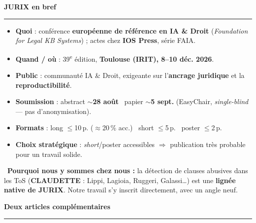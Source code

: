 \documentclass[fontsize=9pt,a4paper]{scrartcl}
\newcommand{\heading}[2]{%
  \par\vspace{7pt}%
  {\sffamily\bfseries\color{navy}\small #1\hspace{0.5em}#2}\par\vspace{1pt}%
  {\color{gold}\rule{\linewidth}{1pt}}\par\vspace{4pt}}
\begin{document}
\heading{\faUniversity}{JURIX en bref}
{\small
\begin{minipage}[t]{0.485\linewidth}
\begin{itemize}
  \item \textbf{Quoi} : conférence \textbf{européenne de référence en IA \& Droit} (\emph{Foundation for
  Legal KB Systems}) ; actes chez \textbf{IOS Press}, série FAIA.
  \item \textbf{Quand / où} : 39\textsuperscript{e} édition, \textbf{Toulouse (IRIT), 8–10 déc. 2026}.
  \item \textbf{Public} : communauté IA \& Droit, exigeante sur l'\textbf{ancrage juridique} et la
  \textbf{reproductibilité}.
\end{itemize}
\end{minipage}\hfill
\begin{minipage}[t]{0.485\linewidth}
\begin{itemize}
  \item \textbf{Soumission} : abstract \textbf{$\sim$28 août} \textbullet\ papier \textbf{$\sim$5 sept.}
  (EasyChair, \emph{single-blind} — pas d'anonymisation).
  \item \textbf{Formats} : long $\le$10\,p. ($\approx$20\,\% acc.) \textbullet\ short $\le$5\,p.
  \textbullet\ poster $\le$2\,p.
  \item \textbf{Choix stratégique} : \emph{short}/poster accessibles $\Rightarrow$ publication très
  probable pour un travail solide.
\end{itemize}
\end{minipage}}
\vspace{3pt}

{\small\textcolor{navy}{\faCheckCircle}~\textbf{Pourquoi nous y sommes chez nous :} la détection de
clauses abusives dans les ToS (\textbf{CLAUDETTE} : Lippi, Lagioia, Ruggeri, Galassi\ldots) est une
\textbf{lignée native de JURIX}. Notre travail s'y inscrit directement, avec un angle neuf.}

\heading{\faLayerGroup}{Deux articles complémentaires}
\end{document}
